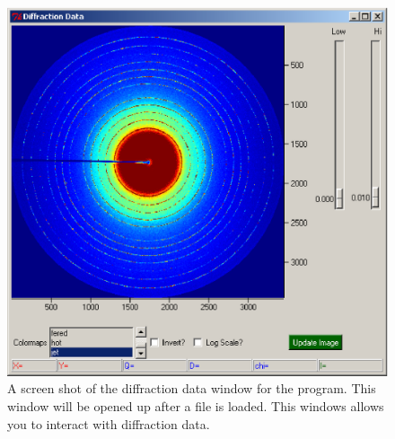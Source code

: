 \begin{figure}
    \centering
    \includegraphics[scale=.75]{figures/diffraction_data_window.eps}
    \caption{A screen shot of the diffraction data window for
    the program. This window will be opened up after a file is 
    loaded. This windows allows you to interact with diffraction 
    data.} 
    \label{diffraction_data_window}
\end{figure}


